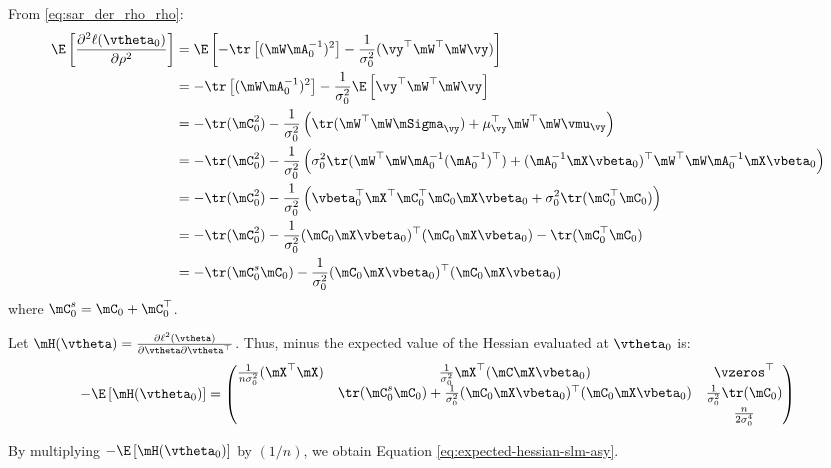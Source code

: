 \documentclass[english,12pt]{book}\usepackage[]{graphicx}\usepackage[]{xcolor}
\begin{document}
\begin{subappendices}
From \eqref{eq:sar_der_rho_rho}:
\begin{equation}\label{eq:E_der_rho_rho}
  \begin{aligned}
\E\left[\frac{\partial^2 \ell(\vtheta_0)}{\partial \rho ^2}\right]  & =  \E\left[- \tr\left[(\mW\mA_0^{-1})^2\right] - \frac{1}{\sigma^2_0}(\vy^{\top}\mW^{\top}\mW\vy)\right] \\
  & =  - \tr\left[(\mW\mA^{-1}_0)^2\right] - \frac{1}{\sigma^2_0} \E\left[\vy^{\top}\mW^{\top}\mW\vy\right] \\
  & = - \tr(\mC_0^2) -\frac{1}{\sigma^2_0} \left(\tr(\mW^{\top}\mW\mSigma_{\vy}) + \mu_{\vy}^\top\mW^{\top}\mW\vmu_{\vy}\right) \\
  & = - \tr(\mC_0^2) -\frac{1}{\sigma^2_0}\left(\sigma_0^2\tr(\mW^{\top}\mW\mA_0^{-1}(\mA_0^{-1})^\top) + (\mA_0^{-1}\mX\vbeta_0)^\top\mW^{\top}\mW\mA_0^{-1}\mX\vbeta_0\right) \\
 & = - \tr(\mC_0^2) - \frac{1}{\sigma^2_0}\left(\vbeta_0^\top\mX^\top\mC_0^\top\mC_0\mX\vbeta_0 + \sigma_0^2\tr(\mC_0^\top\mC_0)\right) \\
 & = - \tr(\mC_0^2) - \frac{1}{\sigma^2_0}(\mC_0\mX\vbeta_0)^\top(\mC_0\mX\vbeta_0) - \tr(\mC_0^\top\mC_0) \\
 & = - \tr(\mC_0^s\mC_0) - \frac{1}{\sigma^2_0}(\mC_0\mX\vbeta_0)^\top(\mC_0\mX\vbeta_0)
\end{aligned}
\end{equation}
%
where $\mC_0^s = \mC_0 + \mC_0^\top$. 

Let $\mH(\vtheta) = \frac{\partial \ell^2(\vtheta)}{\partial \vtheta \partial \vtheta^\top}$. Thus, minus the expected value of the Hessian evaluated at $\vtheta_0$ is:
\begin{equation}
	- \E\left[\mH(\vtheta_0)\right]= 
\begin{pmatrix}
	\frac{1}{n\sigma^2_0}(\mX^\top \mX)  & \frac{1}{\sigma^2_0} \mX^\top (\mC\mX\vbeta_0) & \vzeros^\top \\
	   & \tr(\mC^s_{0}\mC_{0}) + \frac{1}{\sigma^2_0}(\mC_{0}\mX\vbeta_0)^\top(\mC_{0}\mX\vbeta_0) &  \frac{1}{\sigma^2_0} \tr(\mC_{0}) \\
		 &  & \frac{n}{2\sigma^4_0}
	\end{pmatrix} 
\end{equation}

By multiplying $-\E\left[\mH(\vtheta_0)\right]$ by $(1/n)$, we obtain Equation \eqref{eq:expected-hessian-slm-asy}. 



\end{subappendices}
\end{document}
